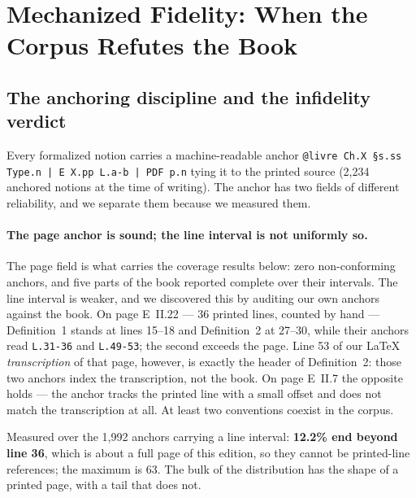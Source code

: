 \documentclass[11pt]{article}
\theoremstyle{remark}\newtheorem{example}{Example}
\begin{document}
\section{Mechanized Fidelity: When the Corpus Refutes the Book}
\label{sec:fidelity}
\subsection{The anchoring discipline and the infidelity verdict}
Every formalized notion carries a machine-readable anchor
\texttt{@livre Ch.X \S{}s.ss Type.n | E X.pp L.a-b | PDF p.n} tying it to the printed
source (2{,}234 anchored notions at the time of writing). The anchor has two fields of
different reliability, and we separate them because we measured them.

\paragraph{The page anchor is sound; the line interval is not uniformly so.} The page
field is what carries the coverage results below: zero non-conforming anchors, and five
parts of the book reported complete over their intervals. The line interval is weaker,
and we discovered this by auditing our own anchors against the book. On page E~II.22 ---
36 printed lines, counted by hand --- Definition~1 stands at lines 15--18 and
Definition~2 at 27--30, while their anchors read \texttt{L.31-36} and \texttt{L.49-53};
the second exceeds the page. Line 53 of our \LaTeX{} \emph{transcription} of that page,
however, is exactly the header of Definition~2: those two anchors index the
transcription, not the book. On page E~II.7 the opposite holds --- the anchor tracks the
printed line with a small offset and does not match the transcription at all. At least
two conventions coexist in the corpus.

Measured over the 1{,}992 anchors carrying a line interval: \textbf{12.2\% end beyond
line 36}, which is about a full page of this edition, so they cannot be printed-line
references; the maximum is 63. The bulk of the distribution has the shape of a printed
page, with a tail that does not.
\end{document}
